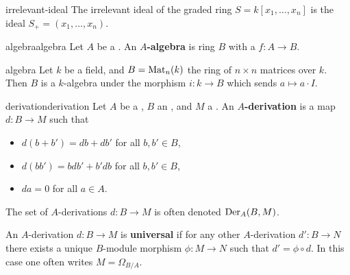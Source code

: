 \begin{example}{irrelevant-ideal}
    The irrelevant ideal of the graded ring $S = k[x_1, \ldots, x_n]$ is the ideal $S_+ = (x_1, \ldots, x_n)$.
\end{example}

\begin{topic}{algebra}{algebra}
    Let $A$ be a . An \textbf{$A$-algebra} is ring $B$ with a  $f : A \to B$.
\end{topic}

\begin{example}{algebra}
    Let $k$ be a field, and $B = \textup{Mat}_{n}(k)$ the ring of $n \times n$ matrices over $k$. Then $B$ is a $k$-algebra under the morphism $i : k \to B$ which sends $a \mapsto a \cdot I$.
\end{example}

\begin{topic}{derivation}{derivation}
    Let $A$ be a , $B$ an , and $M$ a . An \textbf{$A$-derivation} is a map $d : B \to M$ such that
    \begin{itemize}
        \item $d(b + b') = db + db'$ for all $b, b' \in B$,
        \item $d(bb') = bdb' + b'db$ for all $b, b' \in B$,
        \item $da = 0$ for all $a \in A$.
    \end{itemize}
    The set of $A$-derivations $d : B \to M$ is often denoted $\textup{Der}_A(B, M)$.
    
    An $A$-derivation $d : B \to M$ is \textbf{universal} if for any other $A$-derivation $d' : B \to N$ there exists a unique $B$-module morphism $\phi : M \to N$ such that $d' = \phi \circ d$. In this case one often writes $M = \Omega_{B/A}$.
\end{topic}

